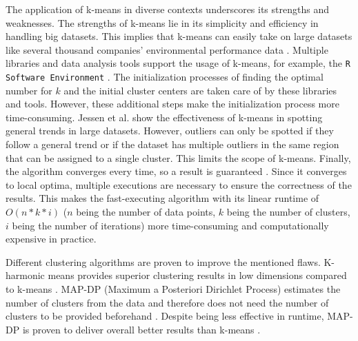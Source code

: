 The application of k-means in diverse contexts underscores its strengths and weaknesses.
The strengths of k-means lie in its simplicity and efficiency in handling big datasets.
This implies that k-means can easily take on large datasets like several thousand companies' environmental performance data \cite{LIU-BDE}.
Multiple libraries and data analysis tools support the usage of k-means, for example, the \texttt{R Software Environment} \cite{R-SOF}.
The initialization processes of finding the optimal number for $k$ and the initial cluster centers are taken care of by these libraries and tools.
However, these additional steps make the initialization process more time-consuming.
Jessen et al. \cite{JES-IND} show the effectiveness of k-means in spotting general trends in large datasets.
However, outliers can only be spotted if they follow a general trend or if the dataset has multiple outliers in the same region that can be assigned to a single cluster.
This limits the scope of k-means.
Finally, the algorithm converges every time, so a result is guaranteed \cite{SEL-GCT}.
Since it converges to local optima, multiple executions are necessary to ensure the correctness of the results.
This makes the fast-executing algorithm with its linear runtime of $O(n * k * i)$ ($n$ being the number of data points, $k$ being the number of clusters, $i$ being the number of iterations) more time-consuming and computationally expensive in practice.

Different clustering algorithms are proven to improve the mentioned flaws.
K-harmonic means provides superior clustering results in low dimensions compared to k-means \cite{HAM-ALT}.
MAP-DP (Maximum a Posteriori Dirichlet Process) estimates the number of clusters from the data and therefore does not need the number of clusters to be provided beforehand \cite{RAY-ALT}.
Despite being less effective in runtime, MAP-DP is proven to deliver overall better results than k-means \cite{RAY-ALT}.

